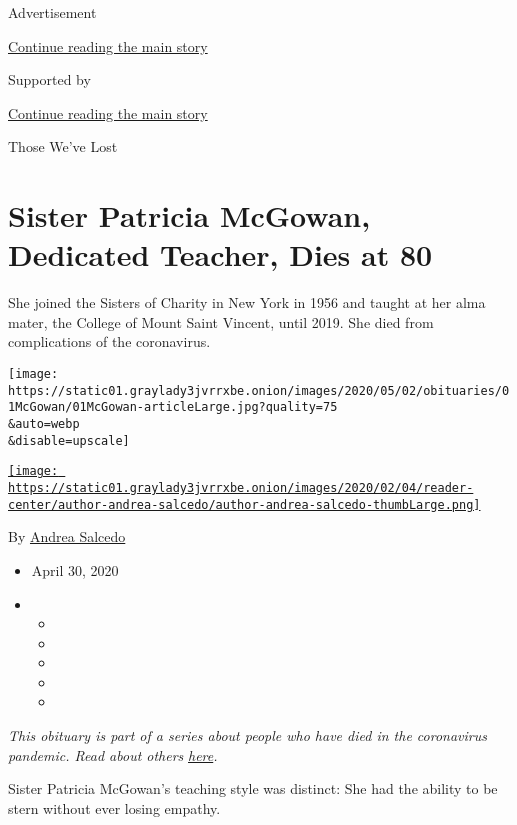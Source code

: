 Advertisement

\protect\hyperlink{after-top}{Continue reading the main story}

Supported by

\protect\hyperlink{after-sponsor}{Continue reading the main story}

Those We've Lost

\hypertarget{sister-patricia-mcgowan-dedicated-teacher-dies-at-80}{%
\section{Sister Patricia McGowan, Dedicated Teacher, Dies at
80}\label{sister-patricia-mcgowan-dedicated-teacher-dies-at-80}}

She joined the Sisters of Charity in New York in 1956 and taught at her
alma mater, the College of Mount Saint Vincent, until 2019. She died
from complications of the coronavirus.

\texttt{[image: https://static01.graylady3jvrrxbe.onion/images/2020/05/02/obituaries/01McGowan/01McGowan-articleLarge.jpg?quality=75\\\&auto=webp\\\&disable=upscale]}

\href{https://www.nytimes3xbfgragh.onion/by/andrea-salcedo}{\texttt{[image: https://static01.graylady3jvrrxbe.onion/images/2020/02/04/reader-center/author-andrea-salcedo/author-andrea-salcedo-thumbLarge.png]}}

By \href{https://www.nytimes3xbfgragh.onion/by/andrea-salcedo}{Andrea
Salcedo}

\begin{itemize}
\item
  April 30, 2020
\item
  \begin{itemize}
  \item
  \item
  \item
  \item
  \item
  \end{itemize}
\end{itemize}

\emph{This obituary is part of a series about people who have died in
the coronavirus pandemic. Read about others}
\href{https://www.nytimes3xbfgragh.onion/series/people-who-have-died-of-the-coronavirus}{\emph{here}}\emph{.}

Sister Patricia McGowan's teaching style was distinct: She had the
ability to be stern without ever losing empathy.

